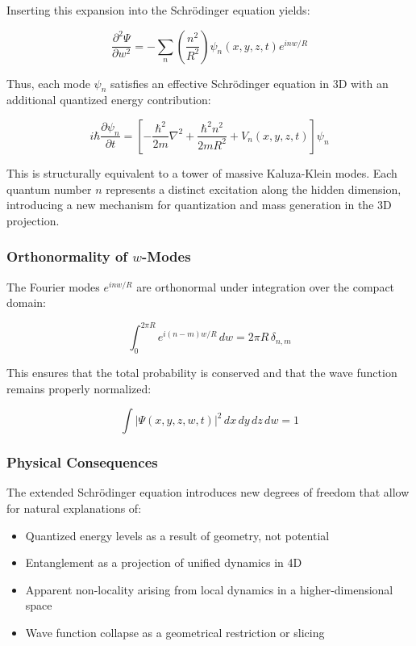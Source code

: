 \documentclass[12pt]{article}
\begin{document}
Inserting this expansion into the Schrödinger equation yields:

\begin{equation}
\frac{\partial^2 \Psi}{\partial w^2} = - \sum_n \left( \frac{n^2}{R^2} \right) \psi_n(x, y, z, t) e^{i n w / R}
\end{equation}

Thus, each mode \( \psi_n \) satisfies an effective Schrödinger equation in 3D with an additional quantized energy contribution:

\begin{equation}
i\hbar \frac{\partial \psi_n}{\partial t} = \left[ -\frac{\hbar^2}{2m} \nabla^2 + \frac{\hbar^2 n^2}{2m R^2} + V_n(x, y, z, t) \right] \psi_n
\end{equation}

This is structurally equivalent to a tower of massive Kaluza-Klein modes. Each quantum number \( n \) represents a distinct excitation along the hidden dimension, introducing a new mechanism for quantization and mass generation in the 3D projection.

\subsubsection{Orthonormality of \( w \)-Modes}

The Fourier modes \( e^{i n w / R} \) are orthonormal under integration over the compact domain:

\begin{equation}
\int_0^{2\pi R} e^{i(n - m)w / R} \, dw = 2\pi R \, \delta_{n,m}
\end{equation}

This ensures that the total probability is conserved and that the wave function remains properly normalized:

\begin{equation}
\int |\Psi(x, y, z, w, t)|^2 \, dx \, dy \, dz \, dw = 1
\end{equation}

\subsubsection{Physical Consequences}

The extended Schrödinger equation introduces new degrees of freedom that allow for natural explanations of:

\begin{itemize}
  \item Quantized energy levels as a result of geometry, not potential
  \item Entanglement as a projection of unified dynamics in 4D
  \item Apparent non-locality arising from local dynamics in a higher-dimensional space
  \item Wave function collapse as a geometrical restriction or slicing
\end{itemize}
\end{document}
